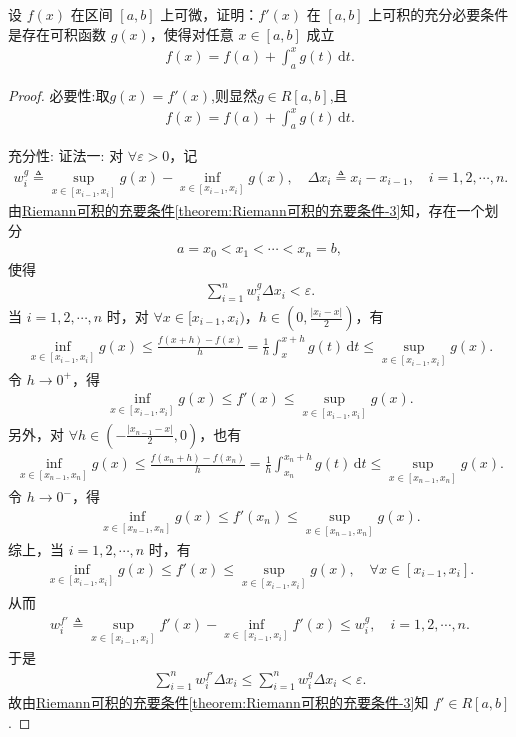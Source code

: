 \documentclass[../../main.tex]{subfiles}%
\begin{document}
\begin{example}
设 $f(x)$ 在区间 $[a,b]$ 上可微，证明：$f'(x)$ 在 $[a,b]$ 上可积的充分必要条件是存在可积函数 $g(x)$，使得对任意 $x\in[a,b]$ 成立
\begin{align*}
f(x)=f(a)+\int_a^x g(t)\,\mathrm{d}t.
\end{align*}
\end{example}
\begin{proof}

{\heiti 必要性:}取$g(x)=f'(x)$,则显然$g\in R[a,b]$,且
\begin{align*}
f(x)=f(a)+\int_a^x g(t)\,\mathrm{d}t.
\end{align*}

{\heiti 充分性:}
{\color{blue}证法一:} 对 $\forall \varepsilon>0$，记
\begin{align*}
w_{i}^{g}\triangleq \sup_{x\in[x_{i-1},x_i]}g(x)-\inf_{x\in[x_{i-1},x_i]}g(x),\quad \Delta x_i\triangleq x_i-x_{i-1},\quad i=1,2,\cdots,n.
\end{align*}
由\hyperref[theorem:Riemann可积的充要条件-3]{Riemann可积的充要条件\ref{theorem:Riemann可积的充要条件-3}}知，存在一个划分
\begin{align*}
a=x_0<x_1<\cdots<x_n=b,
\end{align*}
使得
\begin{align*}
\sum_{i=1}^n w_{i}^{g}\Delta x_i<\varepsilon.
\end{align*}
当 $i=1,2,\cdots,n$ 时，对 $\forall x\in[x_{i-1},x_i)$，$h\in(0,\frac{|x_i-x|}{2})$，有
\begin{align*}
\inf_{x\in[x_{i-1},x_i]}g(x)\leqslant \frac{f(x+h)-f(x)}{h}=\frac{1}{h}\int_x^{x+h}g(t)\,\mathrm{d}t\leqslant \sup_{x\in[x_{i-1},x_i]}g(x).
\end{align*}
令 $h\to 0^+$，得
\begin{align*}
\inf_{x\in[x_{i-1},x_i]}g(x)\leqslant f'(x)\leqslant \sup_{x\in[x_{i-1},x_i]}g(x).
\end{align*}
另外，对 $\forall h\in(-\frac{|x_{n-1}-x|}{2},0)$，也有
\begin{align*}
\inf_{x\in[x_{n-1},x_n]}g(x)\leqslant \frac{f(x_n+h)-f(x_n)}{h}=\frac{1}{h}\int_{x_n}^{x_n+h}g(t)\,\mathrm{d}t\leqslant \sup_{x\in[x_{n-1},x_n]}g(x).
\end{align*}
令 $h\to 0^-$，得
\begin{align*}
\inf_{x\in[x_{n-1},x_n]}g(x)\leqslant f'(x_n)\leqslant \sup_{x\in[x_{n-1},x_n]}g(x).
\end{align*}
综上，当 $i=1,2,\cdots,n$ 时，有
\begin{align*}
\inf_{x\in[x_{i-1},x_i]}g(x)\leqslant f'(x)\leqslant \sup_{x\in[x_{i-1},x_i]}g(x),\quad \forall x\in[x_{i-1},x_i].
\end{align*}
从而
\begin{align*}
w_{i}^{f'}\triangleq \sup_{x\in[x_{i-1},x_i]}f'(x)-\inf_{x\in[x_{i-1},x_i]}f'(x)\leqslant w_{i}^{g},\quad i=1,2,\cdots,n.
\end{align*}
于是
\begin{align*}
\sum_{i=1}^n w_{i}^{f'}\Delta x_i\leqslant \sum_{i=1}^n w_{i}^{g}\Delta x_i<\varepsilon.
\end{align*}
故由\hyperref[theorem:Riemann可积的充要条件-3]{Riemann可积的充要条件\ref{theorem:Riemann可积的充要条件-3}}知 $f'\in R[a,b]$.


\end{proof}
\end{document}
